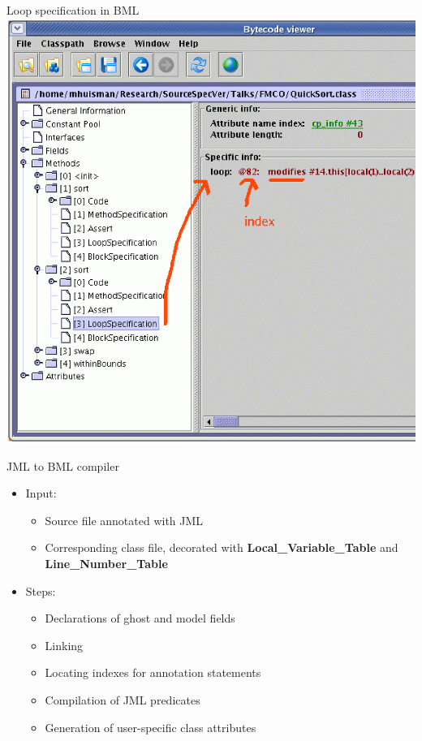 \documentclass[final,nocolorBG,a4,mobius,nototal,pdf,slideColor]{prosper}
\begin{document}
\begin{slide}{Loop specification in BML}
\vspace*{-1.5em}
\includegraphics[height=\textheight]{screen12.ps}
\end{slide}





\begin{slide}{JML to BML compiler}
 \begin{itemize}
 \item Input:
 \begin{itemize}
  \item Source file annotated with JML 
  \item Corresponding class file, decorated with
\textbf{Local\_Variable\_Table} and \textbf{Line\_Number\_Table} 
 \end{itemize}
 \item Steps:
 \begin{itemize}
  \item Declarations of ghost and model fields
  \item Linking 
  \item Locating indexes for annotation statements
  \item Compilation of JML predicates
  \item Generation of user-specific class attributes
 \end{itemize}
 
\end{itemize}
\end{slide}
\end{document}
